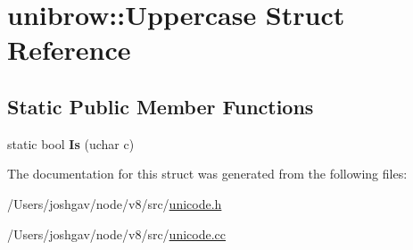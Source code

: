 \hypertarget{structunibrow_1_1_uppercase}{}\section{unibrow\+:\+:Uppercase Struct Reference}
\label{structunibrow_1_1_uppercase}
\subsection*{Static Public Member Functions}
\begin{DoxyCompactItemize}
\item 
static bool {\bfseries Is} (uchar c)\hypertarget{structunibrow_1_1_uppercase_aa37be30817948f9926a099bc60a45973}{}\label{structunibrow_1_1_uppercase_aa37be30817948f9926a099bc60a45973}

\end{DoxyCompactItemize}


The documentation for this struct was generated from the following files\+:\begin{DoxyCompactItemize}
\item 
/\+Users/joshgav/node/v8/src/\hyperlink{unicode_8h}{unicode.\+h}\item 
/\+Users/joshgav/node/v8/src/\hyperlink{unicode_8cc}{unicode.\+cc}\end{DoxyCompactItemize}
